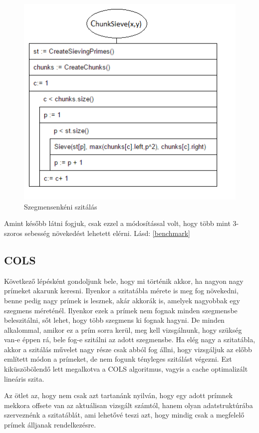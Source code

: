 \documentclass[twoside, a4paper, 12pt]{article}
\begin{document}
\begin{figure}[h]
\centering
\includegraphics{img/chunk_stuki.png}
\caption{Szegmensenkéni szitálás}
\end{figure}

Amint később látni fogjuk, csak ezzel a módosítással volt, hogy több mint 3-szoros sebesség növekedést lehetett elérni. Lásd: \ref{benchmark}

\subsection{COLS} \label{cols} \cite{COLS} \cite{COLS2}

Következő lépésként gondoljunk bele, hogy mi történik akkor, ha nagyon nagy prímeket akarunk keresni. Ilyenkor a szitatábla mérete is meg fog növekedni, benne pedig nagy prímek is lesznek, akár akkorák is, amelyek nagyobbak egy szegmens méreténél. Ilyenkor ezek a prímek nem fognak minden szegmensbe beleszitálni, sőt lehet, hogy több szegmens ki fognak hagyni. De minden alkalommal, amikor ez a prím sorra kerül, meg kell vizsgálnunk, hogy szükség van-e éppen rá, bele fog-e szitálni az adott szegmensbe. Ha elég nagy a szitatábla, akkor a szitálás művelet nagy része csak abból fog állni, hogy vizsgáljuk az előbb említett módon a prímeket, de nem fogunk tényleges szitálást végezni. Ezt kiküszöbölendő lett megalkotva a COLS algoritmus, vagyis a cache optimalizált lineáris szita. \par
Az ötlet az, hogy nem csak azt tartanánk nyilván, hogy egy adott prímnek mekkora offsete van az aktuálisan vizsgált számtól, hanem olyan adatstruktúrába szerveznénk a szitatáblát, ami lehetővé teszi azt, hogy mindig csak a megfelelő prímek álljanak rendelkezésre.
\end{document}
